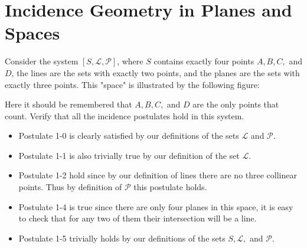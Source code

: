\section{Incidence Geometry in Planes and Spaces}

\begin{problem}
  Consider the system $[S, \mathscr{L}, \mathscr{P}]$, where $S$ contains exactly four points $A, B, C,$ and $D$, the lines are the sets with exactly two points, and the planes are the sets with exactly three points.
  This "space" is illustrated by the following figure:

  \begin{figure}[!h]
    \centering
    \renewcommand{\thefigure}{2.5}
    \caption{}
  \end{figure}

  Here it should be remembered that $A, B, C,$ and $D$ are the only points that count.
  Verify that all the incidence postulates hold in this system.
\end{problem}

\begin{solution}
  \begin{itemize}
    \item Postulate 1-0 is clearly satisfied by our definitions of the sets $\mathscr{L}$ and $\mathscr{P}$.
    \item Postulate 1-1 is also trivially true by our definition of the set $\mathscr{L}$.
    \item Postulate 1-2 hold since by our definition of lines there are no three collinear points.
      Thus by definition of $\mathscr{P}$ this postulate holds.
    \item Postulate 1-4 is true since there are only four planes in this space, it is easy to check that for any two of them their intersection will be a line.
    \item Postulate 1-5 trivially holds by our definitions of the sets $S, \mathscr{L},$ and $\mathscr{P}$.
  \end{itemize}
\end{solution}

